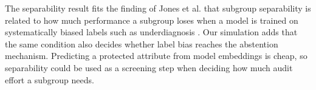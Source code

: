 The separability result fits the finding of Jones et al. that subgroup separability is related to how much performance a subgroup loses when a model is trained on systematically biased labels such as underdiagnosis \cite{jones2023}. Our simulation adds that the same condition also decides whether label bias reaches the abstention mechanism. Predicting a protected attribute from model embeddings is cheap, so separability could be used as a screening step when deciding how much audit effort a subgroup needs.
